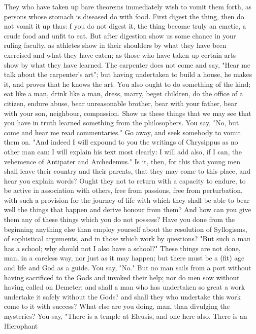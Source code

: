 \documentclass[a4paper]{article}
\begin{document}
    They who have taken up bare theorems immediately wish to vomit them forth,
as persons whose stomach is diseased do with food. First digest the thing, then
do not vomit it up thus: f you do not digest it, the thing become truly an
emetic, a crude food and unfit to eat. But after digestion show us some chance
in your ruling faculty, as athletes show in their shoulders by what they have
been exercised and what they have eaten; as those who have taken up certain
arts show by what they have learned. The carpenter does not come and say, "Hear
me talk about the carpenter's art"; but having undertaken to build a house, he
makes it, and proves that he knows the art. You also ought to do something of
the kind; eat like a man, drink like a man, dress, marry, beget children, do
the office of a citizen, endure abuse, bear unreasonable brother, bear with
your father, bear with your son, neighbour, compassion. Show us these things
that we may see that you have in truth learned something from the philosophers.
You say, "No, but come and hear me read commentaries." Go away, and seek
somebody to vomit them on. "And indeed I will expound to you the writings of
Chrysippus as no other man can: I will explain his text most clearly: I will
add also, if I can, the vehemence of Antipater and Archedemus."
    Is it, then, for this that young men shall leave their country and their
parents, that they may come to this place, and hear you explain words? Ought
they not to return with a capacity to endure, to be active in association with
others, free from passions, free from perturbation, with such a provision for
the journey of life with which they shall be able to bear well the things that
happen and derive honour from them? And how can you give them any of these
things which you do not possess? Have you done from the beginning anything else
than employ yourself about the resolution of Syllogisms, of sophistical
arguments, and in those which work by questions? "But such a man has a school;
why should not I also have a school?" These things are not done, man, in a
careless way, nor just as it may happen; but there must be a (fit) age and life
and God as a guide. You say, "No." But no man sails from a port without having
sacrificed to the Gods and invoked their help; nor do men sow without having
called on Demeter; and shall a man who has undertaken so great a work undertake
it safely without the Gods? and shall they who undertake this work come to it
with success? What else are you doing, man, than divulging the mysteries? You
say, "There is a temple at Eleusis, and one here also. There is an Hierophant
\end{document}
